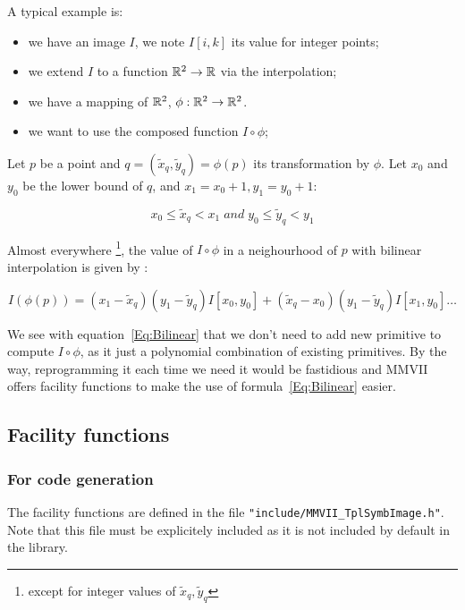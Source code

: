 A typical example is:

\begin{itemize}
      \item we have an image $I$, we note $I[i,k]$ its value for integer points;
      \item we extend  $I$ to a function $\mathbb{R}^2 \rightarrow \mathbb{R}$ via the interpolation;
      \item we have a mapping of  $\mathbb{R}^2$,  $\phi : \mathbb{R}^2 \rightarrow \mathbb{R}^2$.
      \item we want to use the composed function $I \circ \phi$;
\end{itemize}

Let $p$ be a point and $q=(\tilde{x}_q,\tilde{y}_q)=\phi(p)$ its transformation by $\phi$. Let $x_0$ and $y_0$
be the lower bound of $q$, and $x_1=x_0+1, y_1 = y_0+1$:

\begin{equation}
	x_0 \leq \tilde{x}_q < x_1   \; and \;  y_0 \leq \tilde{y}_q < y_1
\end{equation}

Almost everywhere \footnote{except for integer values of $\tilde{x}_q,\tilde{y}_q$ }, 
the value of $I \circ \phi$ in a neighourhood of $p$ with  bilinear
interpolation is given by :

\begin{equation}
	I(\phi(p)) =   (x_1-\tilde{x}_q)(y_1-\tilde{y}_q) I[x_0,y_0]  
	             + (\tilde{x}_q-x_0)(y_1-\tilde{y}_q)I[x_1,y_0] \dots 
		     \label{Eq:Bilinear}
\end{equation}

We see with equation~\ref{Eq:Bilinear} that we don't need to add new primitive to compute $I \circ \phi$,
as it just a polynomial combination of existing primitives. By the way, reprogramming it
each time we need it would be fastidious and MMVII offers facility functions to make the use of 
formula~\ref{Eq:Bilinear}  easier.

\subsection{Facility functions}

\subsubsection{For code generation}

The facility functions are defined in the file {\tt "include/MMVII\_TplSymbImage.h"}. Note that this file 
must be explicitely included as it is not included by default in the library.

